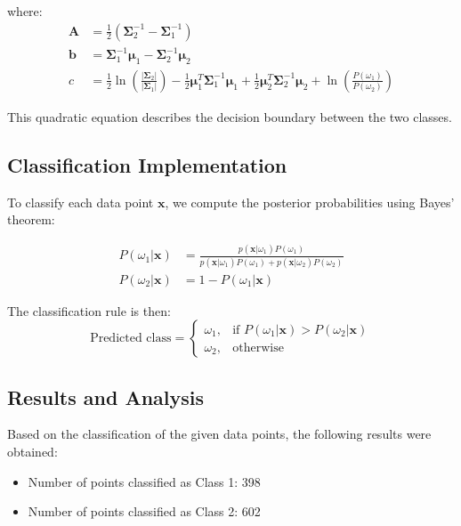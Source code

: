 \documentclass[12pt]{article}
\begin{document}
where:
\begin{align}
\mathbf{A} &= \frac{1}{2}(\boldsymbol{\Sigma}_2^{-1} - \boldsymbol{\Sigma}_1^{-1}) \\
\mathbf{b} &= \boldsymbol{\Sigma}_1^{-1}\boldsymbol{\mu}_1 - \boldsymbol{\Sigma}_2^{-1}\boldsymbol{\mu}_2 \\
c &= \frac{1}{2}\ln\left(\frac{|\boldsymbol{\Sigma}_2|}{|\boldsymbol{\Sigma}_1|}\right) - \frac{1}{2}\boldsymbol{\mu}_1^T\boldsymbol{\Sigma}_1^{-1}\boldsymbol{\mu}_1 + \frac{1}{2}\boldsymbol{\mu}_2^T\boldsymbol{\Sigma}_2^{-1}\boldsymbol{\mu}_2 + \ln\left(\frac{P(\omega_1)}{P(\omega_2)}\right)
\end{align}

This quadratic equation describes the decision boundary between the two classes.

\subsection{Classification Implementation}
To classify each data point $\mathbf{x}$, we compute the posterior probabilities using Bayes' theorem:

\begin{align}
P(\omega_1 | \mathbf{x}) &= \frac{p(\mathbf{x} | \omega_1) P(\omega_1)}{p(\mathbf{x} | \omega_1) P(\omega_1) + p(\mathbf{x} | \omega_2) P(\omega_2)} \\
P(\omega_2 | \mathbf{x}) &= 1 - P(\omega_1 | \mathbf{x})
\end{align}

The classification rule is then:
\begin{equation}
\text{Predicted class} = 
\begin{cases}
\omega_1, & \text{if } P(\omega_1 | \mathbf{x}) > P(\omega_2 | \mathbf{x}) \\
\omega_2, & \text{otherwise}
\end{cases}
\end{equation}

\subsection{Results and Analysis}
Based on the classification of the given data points, the following results were obtained:
\begin{itemize}
    \item Number of points classified as Class 1: 398
    \item Number of points classified as Class 2: 602
\end{itemize}
\end{document}
